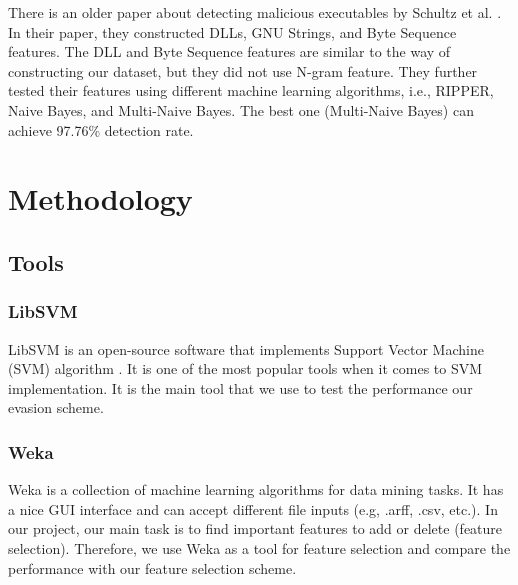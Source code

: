 \documentclass[11pt]{article}
\begin{document}
There is an older paper about detecting malicious executables by Schultz et al. \cite{schultz2001data}. In their paper, they constructed DLLs, GNU Strings, and Byte Sequence features. The DLL and Byte Sequence features are similar to the way of constructing our dataset, but they did not use N-gram feature. They further tested their features using different machine learning algorithms, i.e., RIPPER, Naive Bayes, and Multi-Naive Bayes. The best one (Multi-Naive Bayes) can achieve 97.76\% detection rate.



\section{Methodology}\label{sec:metho}

\subsection{Tools}
\subsubsection{LibSVM}
LibSVM \cite{CC01a} is an open-source software that implements Support Vector Machine (SVM) algorithm \cite{cortes1995support}. It is one of the most popular tools when it comes to SVM implementation. It is the main tool that we use to test the performance our evasion scheme. 

\subsubsection{Weka}
Weka \cite{hall2009weka} is a collection of machine learning algorithms for data mining tasks. It has a nice GUI interface and can accept different file inputs (e.g, .arff, .csv, etc.). In our project, our main task is to find important features to add or delete (feature selection). Therefore, we use Weka as a tool for feature selection and compare the performance with our feature selection scheme.
\end{document}
